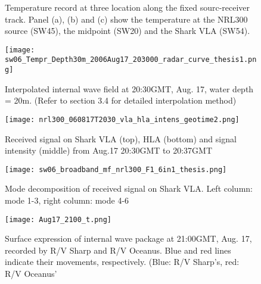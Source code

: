 \begin{figure}[!ht]
    \caption{Temperature record at three location along the fixed sourc-receiver track. Panel (a), (b) and (c) show the temperature at the NRL300 source (SW45), the midpoint (SW20) and the Shark VLA (SW54).}
    \label{fig:nrl300_temp_2}
\end{figure}
%


\begin{figure}[H]
  \centering
  \texttt{[image: sw06\_Tempr\_Depth30m\_2006Aug17\_203000\_radar\_curve\_thesis1.png]}
  \caption{Interpolated internal wave field at 20:30GMT, Aug. 17, water depth = 20m. (Refer to section 3.4 for detailed interpolation method)}\label{fig:r2030_i}
\end{figure}

\begin{figure}[H]
  \centering
  \texttt{[image: nrl300\_060817T2030\_vla\_hla\_intens\_geotime2.png]}
  \caption{Received signal on Shark VLA (top), HLA (bottom) and signal intensity (middle) from Aug.17 20:30GMT to 20:37GMT }\label{fig:a2030}
\end{figure}

\begin{figure}[H]
  \centering
  \texttt{[image: sw06\_broadband\_mf\_nrl300\_F1\_6in1\_thesis.png]}
  \caption{Mode decomposition of received signal on Shark VLA. 
    Left column: mode 1-3, right column: mode 4-6 }\label{fig:m2030}
\end{figure}



\begin{figure}[H]
  \centering
  \texttt{[image: Aug17\_2100\_t.png]}
  \caption{Surface expression of internal wave package at 21:00GMT, Aug. 17, recorded by R/V Sharp and R/V Oceanus. Blue and red lines indicate their movements, respectively. (Blue: R/V Sharp's, red: R/V Oceanus'}\label{fig:r2100_r}
\end{figure}

